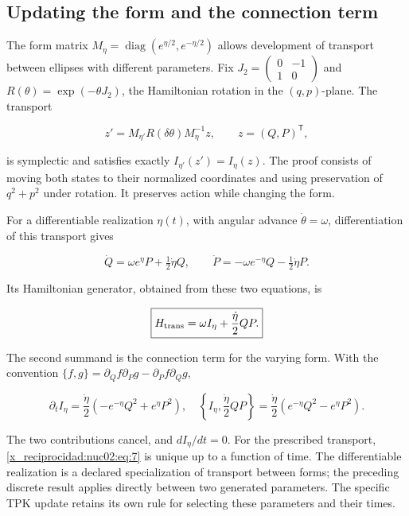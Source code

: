 \subsection{Updating the form and the connection term}

The form matrix \(M_\eta=\operatorname{diag}(e^{\eta/2},e^{-\eta/2})\) allows development of transport between ellipses with different parameters. Fix \(J_2=\begin{pmatrix}0&-1\\1&0\end{pmatrix}\) and \(R(\theta)=\exp(-\theta J_2)\), the Hamiltonian rotation in the \((q,p)\)-plane. The transport

\[
z'=M_{\eta'}R(\delta\theta)M_\eta^{-1}z,
\qquad z=(Q,P)^\mathsf T,
\]

is symplectic and satisfies exactly \(I_{\eta'}(z')=I_\eta(z)\). The proof consists of moving both states to their normalized coordinates and using preservation of \(q^2+p^2\) under rotation. It preserves action while changing the form.

For a differentiable realization \(\eta(t)\), with angular advance \(\dot\theta=\omega\), differentiation of this transport gives

\[
\dot Q=\omega e^\eta P+\tfrac12\dot\eta Q,\qquad
\dot P=-\omega e^{-\eta}Q-\tfrac12\dot\eta P.
\]

Its Hamiltonian generator, obtained from these two equations, is

\begin{equation}
\boxed{H_{\rm trans}=\omega I_\eta+\frac{\dot\eta}{2}QP.}\label{x_reciprocidad:nuc02:eq:7}
\end{equation}

The second summand is the connection term for the varying form. With the convention \(\{f,g\}=\partial_Qf\partial_Pg-\partial_Pf\partial_Qg\),

\[
\partial_tI_\eta=\frac{\dot\eta}{2}(-e^{-\eta}Q^2+e^\eta P^2),
\quad
\left\{I_\eta,\frac{\dot\eta}{2}QP\right\}
=\frac{\dot\eta}{2}(e^{-\eta}Q^2-e^\eta P^2).
\]

The two contributions cancel, and \(dI_\eta/dt=0\). For the prescribed transport, \eqref{x_reciprocidad:nuc02:eq:7} is unique up to a function of time. The differentiable realization is a declared specialization of transport between forms; the preceding discrete result applies directly between two generated parameters. The specific TPK update retains its own rule for selecting these parameters and their times.

